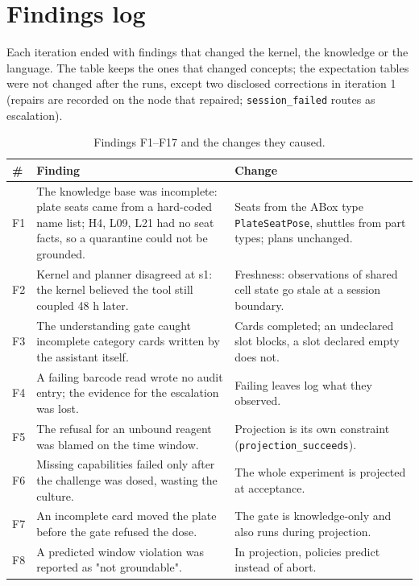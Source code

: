 \documentclass[10pt,a4paper]{article}
\begin{document}
\section{Findings log}\label{sec:findings}

Each iteration ended with findings that changed the kernel, the knowledge or the language. The table keeps the ones that changed concepts; the expectation tables were not changed after the runs, except two disclosed corrections in iteration 1 (repairs are recorded on the node that repaired; \texttt{session\_\allowbreak{}failed} routes as escalation).

\begin{table}[tbp]\centering\footnotesize
\caption{Findings F1–F17 and the changes they caused.}\label{tab:findings}
\begin{tabularx}{\linewidth}{lXX}\toprule
\textbf{\#} & \textbf{Finding} & \textbf{Change} \\\midrule
F1 & The knowledge base was incomplete: plate seats came from a hard-coded name list; H4, L09, L21 had no seat facts, so a quarantine could not be grounded. & Seats from the ABox type \texttt{PlateSeatPose}, shuttles from part types; plans unchanged. \\
F2 & Kernel and planner disagreed at s1: the kernel believed the tool still coupled 48 h later. & Freshness: observations of shared cell state go stale at a session boundary. \\
F3 & The understanding gate caught incomplete category cards written by the assistant itself. & Cards completed; an undeclared slot blocks, a slot declared empty does not. \\
F4 & A failing barcode read wrote no audit entry; the evidence for the escalation was lost. & Failing leaves log what they observed. \\
F5 & The refusal for an unbound reagent was blamed on the time window. & Projection is its own constraint (\texttt{projection\_\allowbreak{}succeeds}). \\
F6 & Missing capabilities failed only after the challenge was dosed, wasting the culture. & The whole experiment is projected at acceptance. \\
F7 & An incomplete card moved the plate before the gate refused the dose. & The gate is knowledge-only and also runs during projection. \\
F8 & A predicted window violation was reported as "not groundable". & In projection, policies predict instead of abort. \\

\end{tabularx}
\end{table}
\end{document}
